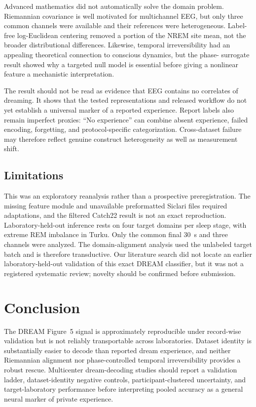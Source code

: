 \documentclass[10pt,twocolumn]{article}
\begin{document}
Advanced mathematics did not automatically solve the domain problem.
Riemannian covariance is well motivated for multichannel EEG, but only three
common channels were available and their references were heterogeneous.
Label-free log-Euclidean centering removed a portion of the NREM site mean, not
the broader distributional differences. Likewise, temporal irreversibility had
an appealing theoretical connection to conscious dynamics, but the phase-
surrogate result showed why a targeted null model is essential before giving a
nonlinear feature a mechanistic interpretation.

The result should not be read as evidence that EEG contains no correlates of
dreaming. It shows that the tested representations and released workflow do
not yet establish a universal marker of a reported experience. Report labels
also remain imperfect proxies: ``No experience'' can combine absent
experience, failed encoding, forgetting, and protocol-specific categorization.
Cross-dataset failure may therefore reflect genuine construct heterogeneity as
well as measurement shift.

\subsection{Limitations}

This was an exploratory reanalysis rather than a prospective preregistration.
The missing feature module and unavailable preformatted Siclari files required
adaptations, and the filtered Catch22 result is not an exact reproduction.
Laboratory-held-out inference rests on four target domains per sleep stage,
with extreme REM imbalance in Turku. Only the common final 30~s and three
channels were analyzed. The domain-alignment analysis used the unlabeled target
batch and is therefore transductive. Our literature search did not locate an
earlier laboratory-held-out validation of this exact DREAM classifier, but it
was not a registered systematic review; novelty should be confirmed before
submission.

\section{Conclusion}

The DREAM Figure~5 signal is approximately reproducible under record-wise
validation but is not reliably transportable across laboratories. Dataset
identity is substantially easier to decode than reported dream experience,
and neither Riemannian alignment nor phase-controlled temporal
irreversibility provides a robust rescue. Multicenter dream-decoding studies
should report a validation ladder, dataset-identity negative controls,
participant-clustered uncertainty, and target-laboratory performance before
interpreting pooled accuracy as a general neural marker of private experience.
\end{document}
